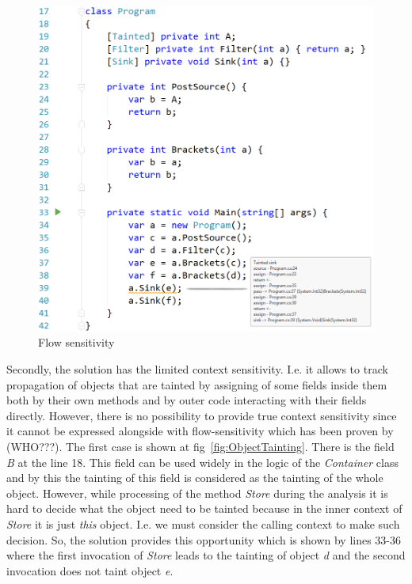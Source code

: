 \begin{figure}[h]
	\includegraphics[width=\linewidth]{screenshots/ReturnsAndBrackets.png}
	\caption{Flow sensitivity}
	\label{fig:ReturnsAndBrackets}
\end{figure}

Secondly, the solution has the limited context sensitivity. I.e. it allows to track propagation of objects that are tainted by assigning of some fields inside them both by their own methods and by outer code interacting with their fields directly.
However, there is no possibility to provide true context sensitivity since it cannot be expressed alongside with flow-sensitivity which has been proven by (WHO???).
The first case is shown at fig~\ref{fig:ObjectTainting}.
There is the field \textit{B} at the line 18. 
This field can be used widely in the logic of the \textit{Container} class and by this the tainting of this field is considered as the tainting of the whole object.
However, while processing of the method \textit{Store} during the analysis it is hard to decide what the object need to be tainted because in the inner context of \textit{Store} it is just \textit{this} object.
I.e. we must consider the calling context to make such decision.
So, the solution provides this opportunity which is shown by lines 33-36 where the first invocation of \textit{Store} leads to the tainting of object \textit{d} and the second invocation does not taint object \textit{e}.

